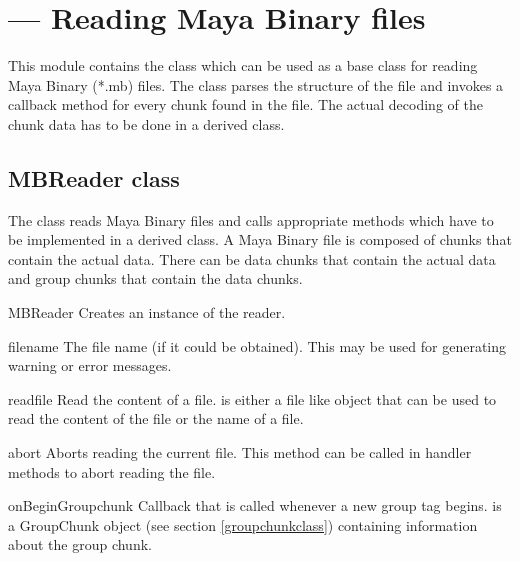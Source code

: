 \section{ ---
        Reading Maya Binary files}


This module contains the  class which can be used as a
base class for reading Maya Binary (*.mb) files. The class parses the
structure of the file and invokes a callback method for every chunk found
in the file. The actual decoding of the chunk data has to be done in a
derived class.
\subsection{MBReader class}

The  class reads Maya Binary files and calls
appropriate methods which have to be implemented in a derived class.
A Maya Binary file is composed of chunks that contain the actual data.
There can be data chunks that contain the actual data and group chunks
that contain the data chunks.

\begin{classdesc}{MBReader}{}
  Creates an instance of the reader.
\end{classdesc}

\begin{memberdesc}{filename}
The file name (if it could be obtained). This may be used for generating
warning or error messages.
\end{memberdesc}

\begin{methoddesc}{read}{file}
Read the content of a file.  is either a file like object that
can be used to read the content of the file or the name of a file.
\end{methoddesc}

\begin{methoddesc}{abort}{}
Aborts reading the current file.
This method can be called in handler methods to abort reading the file.
\end{methoddesc}

\begin{methoddesc}{onBeginGroup}{chunk}
Callback that is called whenever a new group tag begins.
 is a GroupChunk object (see section \ref{groupchunkclass})
containing information about the group chunk.
\end{methoddesc}

